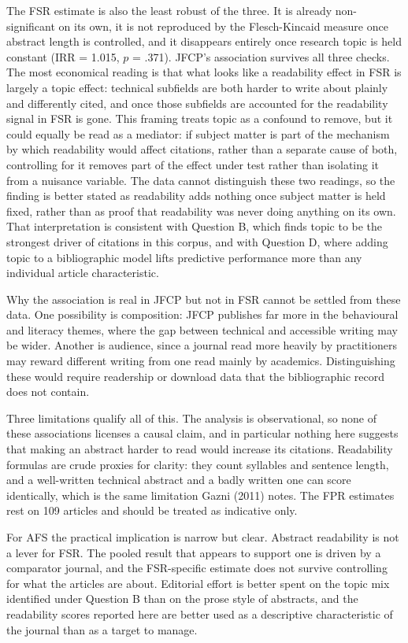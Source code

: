 \documentclass[11pt,a4paper]{article}
\begin{document}
The FSR estimate is also the least robust of the three. It is already non-significant on its own, it is not reproduced by the Flesch-Kincaid measure once abstract length is controlled, and it disappears entirely once research topic is held constant (IRR = 1.015, \(p\) = .371). JFCP's association survives all three checks. The most economical reading is that what looks like a readability effect in FSR is largely a topic effect: technical subfields are both harder to write about plainly and differently cited, and once those subfields are accounted for the readability signal in FSR is gone. This framing treats topic as a confound to remove, but it could equally be read as a mediator: if subject matter is part of the mechanism by which readability would affect citations, rather than a separate cause of both, controlling for it removes part of the effect under test rather than isolating it from a nuisance variable. The data cannot distinguish these two readings, so the finding is better stated as readability adds nothing once subject matter is held fixed, rather than as proof that readability was never doing anything on its own. That interpretation is consistent with Question B, which finds topic to be the strongest driver of citations in this corpus, and with Question D, where adding topic to a bibliographic model lifts predictive performance more than any individual article characteristic.

Why the association is real in JFCP but not in FSR cannot be settled from these data. One possibility is composition: JFCP publishes far more in the behavioural and literacy themes, where the gap between technical and accessible writing may be wider. Another is audience, since a journal read more heavily by practitioners may reward different writing from one read mainly by academics. Distinguishing these would require readership or download data that the bibliographic record does not contain.

Three limitations qualify all of this. The analysis is observational, so none of these associations licenses a causal claim, and in particular nothing here suggests that making an abstract harder to read would increase its citations. Readability formulas are crude proxies for clarity: they count syllables and sentence length, and a well-written technical abstract and a badly written one can score identically, which is the same limitation Gazni (2011) notes. The FPR estimates rest on 109 articles and should be treated as indicative only.

For AFS the practical implication is narrow but clear. Abstract readability is not a lever for FSR. The pooled result that appears to support one is driven by a comparator journal, and the FSR-specific estimate does not survive controlling for what the articles are about. Editorial effort is better spent on the topic mix identified under Question B than on the prose style of abstracts, and the readability scores reported here are better used as a descriptive characteristic of the journal than as a target to manage.
\end{document}

